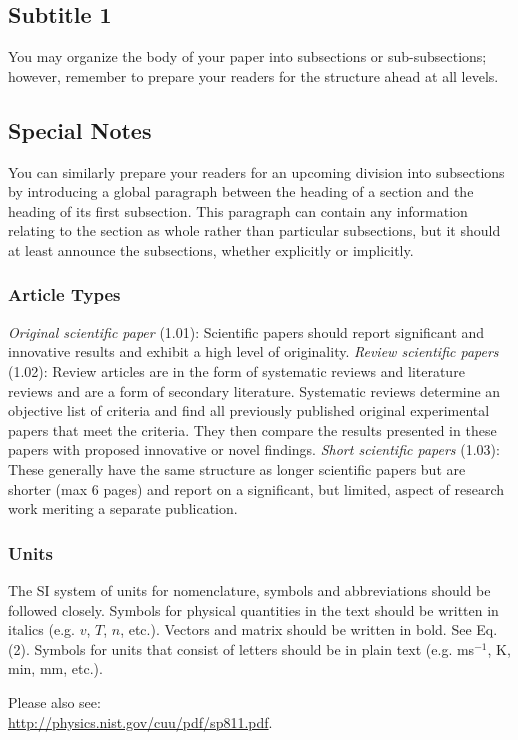 \documentclass[10pt]{JoME}
\begin{document}
\subsection{Subtitle 1}
You may organize the body of your paper into subsections or sub-subsections; however, remember to prepare your readers for the structure ahead at all levels.

\subsection{Special Notes}
You can similarly prepare your readers for an upcoming division into subsections by introducing a global paragraph between the heading of a section and the heading of its first subsection. This paragraph can contain any information relating to the section as whole rather than particular subsections, but it should at least announce the subsections, whether explicitly or implicitly.


\subsubsection{Article Types}
\emph{Original scientific paper} (1.01): Scientific papers should report significant and innovative results and exhibit a high level of originality. \emph{Review scientific papers} (1.02): Review articles are in the form of systematic reviews and literature reviews and are a form of secondary literature. Systematic reviews determine an objective list of criteria and find all previously published original experimental papers that meet the criteria. They then compare the results presented in these papers with proposed innovative or novel findings. \emph{Short scientific papers} (1.03): These generally have the same structure as longer scientific papers but are shorter (max 6 pages) and report on a significant, but limited, aspect of research work meriting a separate publication.

\subsubsection{Units}
The SI system of units for nomenclature, symbols and abbreviations should be followed closely. Symbols for physical quantities in the text should be written in italics (e.g. $v$, $T$, $n$, etc.). Vectors and matrix should be written in bold. See Eq. (2). Symbols for units that consist of letters should be in plain text (e.g. ms$^{-1}$, K, min, mm, etc.). 

Please also see:\\ \href{http://physics.nist.gov/cuu/pdf/sp811.pdf}{http://physics.nist.gov/cuu/pdf/sp811.pdf}.
\end{document}
